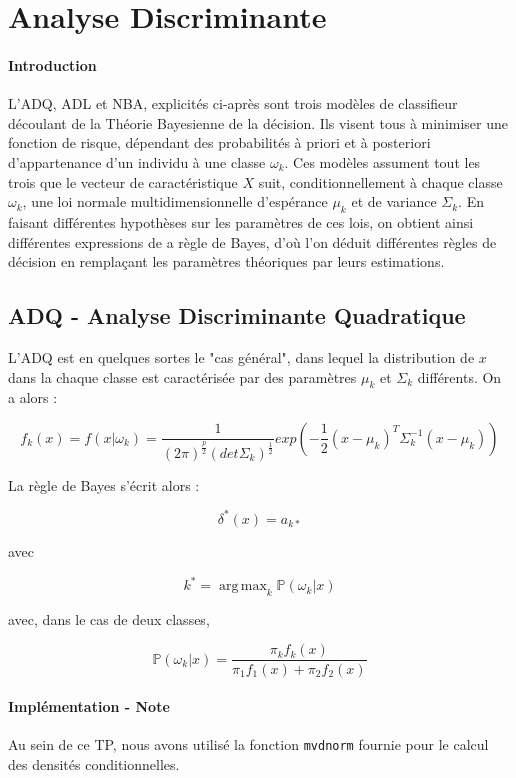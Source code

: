 \documentclass{report}
\DeclareMathOperator*{\argmax}{arg\,max}
\begin{document}
\section{Analyse Discriminante}
\paragraph{Introduction}
L'ADQ, ADL et NBA, explicités ci-après sont trois modèles de classifieur découlant de la Théorie Bayesienne de la décision. Ils visent tous à minimiser une fonction de risque, dépendant des probabilités à priori et à posteriori d'appartenance d'un individu à une classe $\omega_k$. Ces modèles assument tout les trois que le vecteur de caractéristique $X$ suit, conditionnellement à chaque classe $\omega_k$, une loi normale multidimensionnelle d'espérance $\mu_k$ et de variance $\Sigma_k$. En faisant différentes hypothèses sur les paramètres de ces lois, on obtient ainsi différentes expressions de a règle de Bayes, d'où l'on déduit différentes règles de décision en remplaçant les paramètres théoriques par leurs estimations.

\subsection{ADQ - Analyse Discriminante Quadratique}
L'ADQ est en quelques sortes le "cas général", dans lequel la distribution de $x$ dans la chaque classe est caractérisée par des paramètres $\mu_k$ et $\Sigma_k$ différents. On a alors :

$$f_k(x) = f(x | \omega_k) = \frac{1}{(2\pi)^{\frac{p}{2}}(det \Sigma_k)^{\frac{1}{2}}}exp(-\frac{1}{2}(x - \mu_k)^T\Sigma_k^{-1}(x - \mu_k))$$


La règle de Bayes s'écrit alors :


$$\delta^{*}(x) = a_{k*}$$

\newpage
avec


$$k^* = \argmax_k \mathbb{P}(\omega_k | x)$$

avec, dans le cas de deux classes,

$$\mathbb{P}(\omega_k | x) = \frac{\pi_k f_k(x)}{\pi_1 f_1(x) + \pi_2 f_2(x)}$$


\paragraph{Implémentation - Note}
Au sein de ce TP, nous avons utilisé la fonction \verb+mvdnorm+ fournie pour le calcul des densités conditionnelles.
\end{document}
